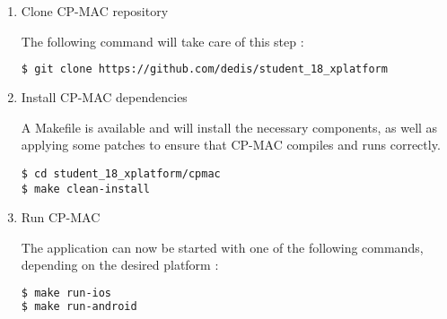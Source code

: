 \begin{enumerate}
	\item Clone CP-MAC repository
	
	The following command will take care of this step :
	\begin{lstlisting}[language=bash]
$ git clone https://github.com/dedis/student_18_xplatform
	\end{lstlisting}
	
	\item Install CP-MAC dependencies
	
	A Makefile is available and will install the necessary components, as well as applying some patches to ensure that CP-MAC compiles and runs correctly.
	\begin{lstlisting}
$ cd student_18_xplatform/cpmac
$ make clean-install
	\end{lstlisting}
	
	\item Run CP-MAC
	
	The application can now be started with one of the following commands, depending on the desired platform :
	\begin{lstlisting}[language=bash]
$ make run-ios
$ make run-android
	\end{lstlisting}
\end{enumerate}